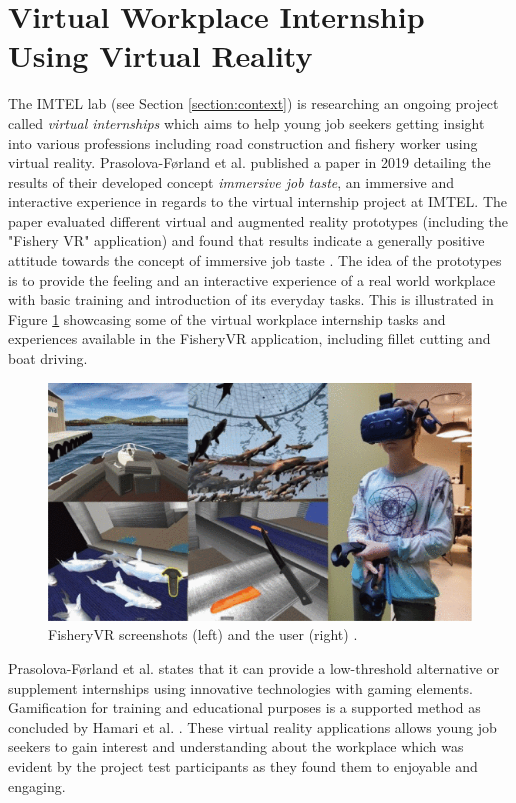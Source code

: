\section{Virtual Workplace Internship Using Virtual Reality}
\label{section:VRworkplaceIntership}
The IMTEL lab (see Section \ref{section:context}) is researching an ongoing project called \textit{virtual internships} which aims to help young job seekers getting insight into various professions including road construction and fishery worker using virtual reality. Prasolova-Førland et al. \cite{prasolova2019empowering} published a paper in 2019 detailing the results of their developed concept \textit{immersive job taste}, an immersive and interactive experience in regards to the virtual internship project at IMTEL. The paper evaluated different virtual and augmented reality prototypes (including the "Fishery VR" application) and found that results indicate a generally positive attitude towards the concept of immersive job taste \cite{prasolova2019empowering}. The idea of the prototypes is to provide the feeling and an interactive experience of a real world workplace with basic training and introduction of its everyday tasks. This is illustrated in Figure \ref{fig:FisheryVR} showcasing some of the virtual workplace internship tasks and experiences available in the FisheryVR application, including fillet cutting and boat driving. 

 \begin{figure}[!ht]
     \centering
     \includegraphics[width=.7\textwidth]{./fig/related_work/fisheryVR.png}
     \caption{FisheryVR screenshots (left) and the user (right) \cite{prasolova2019empowering}.}
     \label{fig:FisheryVR}
 \end{figure}

Prasolova-Førland et al. \cite{prasolova2019empowering} states that it can provide a low-threshold alternative or supplement internships using innovative technologies with gaming elements. Gamification for training and educational purposes is a supported method as concluded by Hamari et al. \cite{hamari2014does}. These virtual reality applications allows young job seekers to gain interest and understanding about the workplace which was evident by the project test participants as they found them to enjoyable and engaging. 

